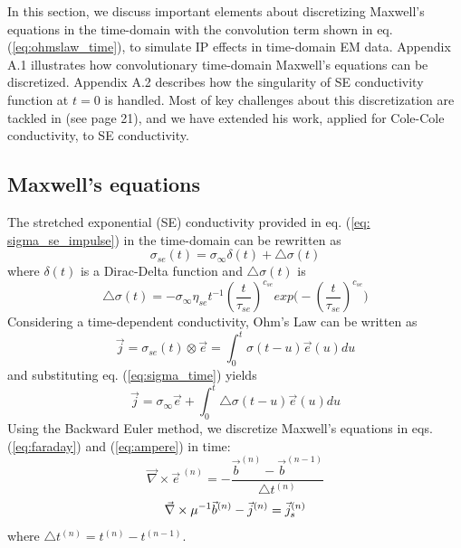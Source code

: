\documentclass[manuscript]{geophysics}
\newcommand{\curl}{{\vec \nabla}\times}
\newcommand{\siginf}{\sigma_\infty}
\newcommand{\dsig}{\triangle\sigma}
\renewcommand {\j}  { {\vec j} }
\renewcommand {\b}  { {\vec b} }
\newcommand {\e}  { {\vec e} }
\begin{document}
\label{app: Discretization}
In this section, we discuss important elements about discretizing Maxwell’s equations in the time-domain with the convolution term shown in eq. (\ref{eq:ohmslaw_time}), to simulate IP effects in time-domain EM data. Appendix A.1 illustrates how convolutionary time-domain Maxwell's equations can be discretized.  Appendix A.2 describes how the singularity of SE conductivity function at $t=0$ is handled. Most of key challenges about this discretization are tackled in \cite{marchant2015} (see page 21), and we have extended his work, applied for Cole-Cole conductivity, to SE conductivity.

\subsection{Maxwell's equations}
\label{app: Maxwell's equations}
The stretched exponential (SE) conductivity provided in eq. (\ref{eq: sigma_se_impulse}) in the time-domain can be rewritten as
\begin{equation}
  \sigma_{se}(t) = \siginf \delta (t) + \dsig (t)
  \label{eq:sigma_time}
\end{equation}
where  $\delta(t)$ is a Dirac-Delta function and $\dsig(t)$ is
\begin{equation}
  \dsig (t) = -\siginf \eta_{se}t^{-1}(\frac{t}{\tau_{se}})^{c_{se}}exp\Big(-(\frac{t}{\tau_{se}})^{c_{se}}\Big)
\end{equation}
Considering a time-dependent conductivity, Ohm's Law can be written as
\begin{equation}
  \j = \sigma_{se}(t) \otimes \e =\int_0^t \sigma(t-u) \e (u) du
  \label{eq:ohmslaw}
\end{equation}
and substituting eq. (\ref{eq:sigma_time}) yields
\begin{equation}
  \j = \siginf \e + \int_0^t \dsig(t-u) \e (u) du
  \label{eq:ohmslaw_two}
\end{equation}
Using the Backward Euler method, we discretize Maxwell's equations in eqs. (\ref{eq:faraday}) and (\ref{eq:ampere}) in time:
\begin{equation}
  \curl \e^{\ (n)} = -\frac{\b^{(n)}-\b^{(n-1)}}{\triangle t^{(n)}}
  \label{eq:faraday_time}
\end{equation}
\begin{equation}
  \curl \mu^{-1} \b^{(n)} - \j^{(n)} = \j_s^{(n)} \\
  \label{eq:ampere_time}
\end{equation}
where $\triangle t^{(n)} = t^{(n)}- t^{(n-1)}$.
\end{document}
